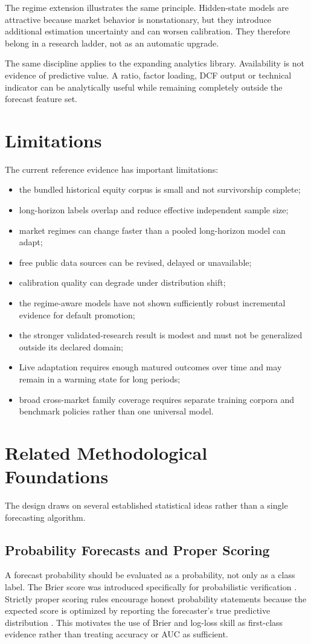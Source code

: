 \documentclass[11pt]{article}
\begin{document}
The regime extension illustrates the same principle. Hidden-state models are attractive because market behavior is nonstationary, but they introduce additional estimation uncertainty and can worsen calibration. They therefore belong in a research ladder, not as an automatic upgrade.

The same discipline applies to the expanding analytics library. Availability is not evidence of predictive value. A ratio, factor loading, DCF output or technical indicator can be analytically useful while remaining completely outside the forecast feature set.

\section{Limitations}
The current reference evidence has important limitations:
\begin{itemize}[itemsep=0.2em]
\item the bundled historical equity corpus is small and not survivorship complete;
\item long-horizon labels overlap and reduce effective independent sample size;
\item market regimes can change faster than a pooled long-horizon model can adapt;
\item free public data sources can be revised, delayed or unavailable;
\item calibration quality can degrade under distribution shift;
\item the regime-aware models have not shown sufficiently robust incremental evidence for default promotion;
\item the stronger validated-research result is modest and must not be generalized outside its declared domain;
\item Live adaptation requires enough matured outcomes over time and may remain in a warming state for long periods;
\item broad cross-market family coverage requires separate training corpora and benchmark policies rather than one universal model.
\end{itemize}


\section{Related Methodological Foundations}
The design draws on several established statistical ideas rather than a single forecasting algorithm.

\subsection{Probability Forecasts and Proper Scoring}
A forecast probability should be evaluated as a probability, not only as a class label. The Brier score was introduced specifically for probabilistic verification \citep{brier1950verification}. Strictly proper scoring rules encourage honest probability statements because the expected score is optimized by reporting the forecaster's true predictive distribution \citep{gneiting2007proper}. This motivates the use of Brier and log-loss skill as first-class evidence rather than treating accuracy or AUC as sufficient.
\end{document}
